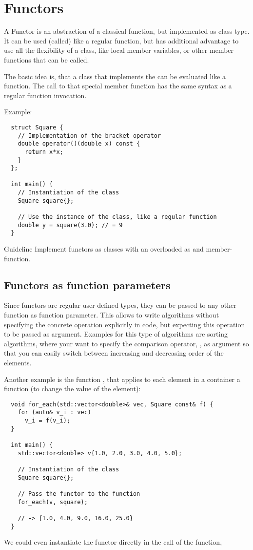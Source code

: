 \chapter{Functors}
A Functor is an abstraction of a classical function, but implemented as class type. It can be used (called) like a regular function, but has additional
advantage to use all the flexibility of a class, like local member variables, or other member functions that can be called.

The basic idea is, that a class that implements the  can be evaluated like a function. The call to that special member function has the same
syntax as a regular function invocation.

Example:
\begin{verbatim}
  struct Square {
    // Implementation of the bracket operator
    double operator()(double x) const {
      return x*x;
    }
  };

  int main() {
    // Instantiation of the class
    Square square{};

    // Use the instance of the class, like a regular function
    double y = square(3.0); // = 9
  }
\end{verbatim}

\begin{guideline}{Guideline}
  Implement functors as classes with an overloaded  as  and  member-function.
\end{guideline}

\section{Functors as function parameters}
Since functors are regular user-defined types, they can be passed to any other function as function parameter. This allows to write algorithms
without specifying the concrete operation explicitly in code, but expecting this operation to be passed as argument. Examples for this type
of algorithms are sorting algorithms, where your want to specify the comparison operator, \eg {}, as argument so that you
can easily switch between increasing and decreasing order of the elements.

Another example is the function , that applies to each element in a container a function (\eg to change the value of the element):
\begin{verbatim}
  void for_each(std::vector<double>& vec, Square const& f) {
    for (auto& v_i : vec)
      v_i = f(v_i);
  }

  int main() {
    std::vector<double> v{1.0, 2.0, 3.0, 4.0, 5.0};

    // Instantiation of the class
    Square square{};

    // Pass the functor to the function
    for_each(v, square);

    // -> {1.0, 4.0, 9.0, 16.0, 25.0}
  }
\end{verbatim}
%
We could even instantiate the functor directly in the call of the  function, \ie
{}

